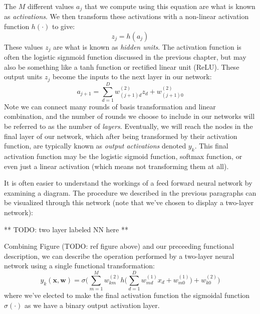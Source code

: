 The $M$ different values $a_{j}$ that we compute using this equation are what is known as \textit{activations}. We then transform these activations with a non-linear activation function $h(\cdot)$ to give:
\begin{equation} \label{basic-nn-z-outputs}
	z_{j} = h(a_{j})
\end{equation}
These values $z_{j}$ are what is known as \textit{hidden units}. The activation function is often the logistic signmoid function discussed in the previous chapter, but may also be something like a tanh function or rectified linear unit (ReLU). These output units $z_{j}$ become the inputs to the next layer in our network:
\begin{equation} \label{basic-nn-form-next-layer}
	a_{j+1} = \sum_{d=1}^{D} w_{(j+1)d}^{(2)} z_{d} + w_{(j+1)0}^{(2)}
\end{equation}
Note we can connect many rounds of basis transformation and linear combination, and the number of rounds we choose to include in our networks will be referred to as the number of \textit{layers}. Eventually, we will reach the nodes in the final layer of our network, which after being transformed by their activation function, are typically known as \textit{output activations} denoted $y_{k}$. This final activation function may be the logistic sigmoid function, softmax function, or even just a linear activation (which means not transforming them at all).

It is often easier to understand the workings of a feed forward neural network by examining a diagram. The procedure we described in the previous paragraphs can be visualized through this network (note that we've chosen to display a two-layer network):

** TODO: two layer labeled NN here **


Combining Figure (TODO: ref figure above) and our preceeding functional description, we can describe the operation performed by a two-layer neural network using a single functional transformation:
\begin{equation} \label{full-nn-equation}
	y_{k}(\textbf{x}, \textbf{w}) = \sigma\bigg(\sum_{m=1}^{M}w_{km}^{(2)} h\bigg(\sum_{d=1}^{D}w_{md}^{(1)}x_{d} + w_{m0}^{(1)}\bigg) + w_{k0}^{(2)}\bigg)
\end{equation}
where we've elected to make the final activation function the sigmoidal function $\sigma(\cdot)$ as we have a binary output activation layer.

